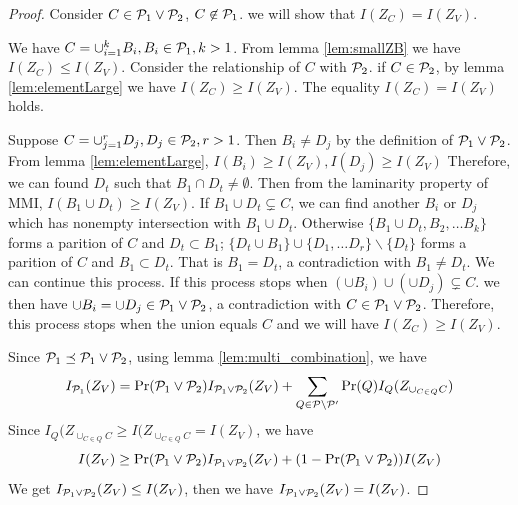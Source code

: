 \documentclass{article}
\begin{document}
\begin{proof}
	
Consider $C \in \P_1 \vee \P_2$, $C\not\in \P_1$. we will show that $I(Z_C) = I(Z_V)$.

We have $C = \cup_{i=1}^k B_i ,B_i\in \P_1, k>1$. 
From lemma \ref{lem:smallZB} we have $I(Z_C) \leq I(Z_V)$.
Consider the relationship of $C$ with $\P_2$. if $C\in \P_2$, by lemma \ref{lem:elementLarge} we have
$I(Z_C) \geq I(Z_V)$. The equality $I(Z_C) = I(Z_V)$ holds.

Suppose  $C = \cup_{j=1}^r D_j ,D_j\in \P_2, r>1$. Then $B_i \neq D_j$ by the definition of $\P_1\vee \P_2$. From lemma \ref{lem:elementLarge}, $I(B_i)\geq I(Z_V), I(D_j) \geq I(Z_V)$
Therefore, we can found $D_t$ such that $B_1 \cap D_t\neq\emptyset$. Then from the laminarity property of MMI, $I(B_1 \cup D_t)\geq I(Z_V)$. If $B_1 \cup D_t \subsetneq C$, we can find another $B_i$ or $D_j$ which has nonempty intersection with  $B_1 \cup D_t$. Otherwise $\{B_1 \cup D_t, B_2, \dots B_k\}$
forms a parition of $C$ and $D_t \subset B_1$; $\{D_t \cup B_1\}\cup \{ D_1, \dots D_r\}\backslash \{D_t\}$
forms a parition of $C$ and $B_1 \subset D_t$. That is $B_1 = D_t$, a contradiction with $B_1 \neq D_t$. 
We can continue this process. If this process stops when $(\cup B_i)\cup(\cup D_j) \subsetneq C$. we then have $\cup B_i = \cup D_j \in \P_1 \vee \P_2$, a contradiction with $C \in \P_1 \vee \P_2$. 
Therefore, this process stops when the union equals $C$ and we will have $I(Z_C) \geq I(Z_V)$.

Since $\P_1 \preceq \P_1 \vee \P_2 $, using lemma \ref{lem:multi_combination}, we have
\begin{equation*}
I_{\P_1}(Z_V) = \Pr(\P_1 \vee \P_2) I_{\P_1 \vee \P_2}(Z_V) + \sum_{Q \in \P\backslash\P'} \Pr(Q) I_{Q}(Z_{\cup_{C\in Q}C})
\end{equation*}
Since $I_{Q}(Z_{\cup_{C\in Q}C}\geq I(Z_{\cup_{C\in Q}C} = I(Z_V)$, we have
\begin{equation*}
I(Z_V) \geq \Pr(\P_1 \vee \P_2) I_{\P_1 \vee \P_2}(Z_V) + (1-\Pr(\P_1 \vee \P_2)) I(Z_V)	
\end{equation*}
We get $I_{\P_1 \vee \P_2}(Z_V) \leq I(Z_V)$, then we have $I_{\P_1 \vee \P_2}(Z_V) =  I(Z_V)$.

\end{proof}
\end{document}
